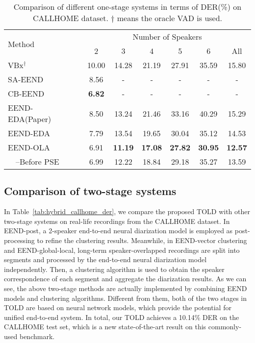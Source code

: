 \documentclass{article}
\begin{document}
\begin{table}[t!]
  \caption{Comparison of different one-stage systems in terms of DER(\%) on CALLHOME dataset. $\dagger$ means the oracle VAD is used.}
  \vspace{0.1cm}
  \label{tab:single_callhome_der}
  \centering
  \setlength\tabcolsep{2.5pt}
  \begin{tabular}{l c c c c c c}
    \toprule 
    \multirow{2}{*}{Method} & \multicolumn{6}{c}{Number of Speakers}  \\
    \cmidrule(lr){2-7}
    & 2  & 3 & 4 & 5 & 6 & All \\
    \midrule
    VBx$^\dagger$\cite{vbx}                   & 10.00   & 14.28   & 21.19 & 27.91 & 35.59 & 15.80    \\
    SA-EEND~\cite{SA_EEND}                         & 8.56    & -   & -	& -	& -	& -    \\
    CB-EEND~\cite{CB_EEND}                         & \textbf{6.82}    & -   & -	& -	& -	& -    \\
    EEND-EDA(Paper)~\cite{EEND_EDA}        & 8.50    & 13.24   & 21.46 & 33.16 & 40.29 & 15.29    \\
    EEND-EDA                & 7.79    & 13.54   & 19.65	& 30.04	& 35.12	& 14.53    \\
    \midrule
    EEND-OLA     & 6.91	    & \textbf{11.19}	& \textbf{17.08}	& \textbf{27.82}	& \textbf{30.95}	& \textbf{12.57}    \\
    ~~--Before PSE    & 6.99	    & 12.22	& 18.84	& 29.18	& 35.27	& 13.59    \\
    \bottomrule
  \end{tabular}
\end{table}

\subsection{Comparison of two-stage systems}
In Table~\ref{tab:hybrid_callhome_der}, we compare the proposed TOLD with other two-stage systems on real-life recordings from the CALLHOME dataset. In EEND-post, a 2-speaker end-to-end neural diarization model is employed as post-processing to refine the clustering results. Meanwhile, in EEND-vector clustering and EEND-global-local, long-term speaker-overlapped recordings are split into segments and processed by the end-to-end neural diarization model independently. Then, a clustering algorithm is used to obtain the speaker correspondence of each segment and aggregate the diarization results.
As we can see, the above two-stage methods are actually implemented by combining EEND models and clustering algorithms. Different from them, both of the two stages in TOLD are based on neural network models, which provide the potential for unified end-to-end system.
In total, our TOLD achieves a 10.14\% DER on the CALLHOME test set, which is a new state-of-the-art result on this commonly-used benchmark.
\end{document}
